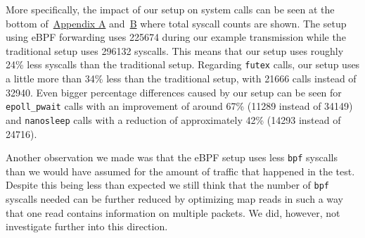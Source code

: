 More specifically, the impact of our setup on system calls can be seen at the bottom 
of~\hyperref[chap:appendix-fast-relay]{Appendix A} and~\hyperref[chap:appendix-plain-relay]{B} 
where total syscall counts are shown.
The setup using eBPF forwarding uses 225674 during our example transmission while the traditional setup 
uses 296132 syscalls.
This means that our setup uses roughly 24\% less syscalls than the traditional setup.
Regarding \verb|futex| calls, our setup uses a little more than 34\% less than the 
traditional setup, with 21666 calls instead of 32940.
Even bigger percentage differences caused by our setup can be seen for \verb|epoll_pwait| calls with 
an improvement of around 67\% (11289 instead of 34149) and \verb|nanosleep| calls with a reduction of 
approximately 42\% (14293 instead of 24716).

Another observation we made was that the eBPF setup uses less \verb|bpf| syscalls than we would have assumed for 
the amount of traffic that happened in the test.
Despite this being less than expected we still think that the number of \verb|bpf| syscalls needed can be 
further reduced by optimizing map reads in such a way that one read contains information on multiple packets.
We did, however, not investigate further into this direction.